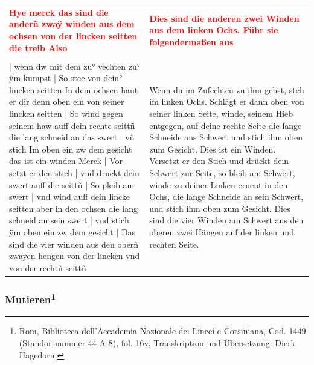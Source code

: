 \begin{longtable}{p{6.25cm}p{6.25cm}}
\textbf{\textcolor{red}{Hye merck das sind die anderñ zwaÿ winden aus dem ochsen von der lincken seitten die treib Also}}
&
\textbf{\textcolor{red}{Dies sind die anderen zwei Winden aus dem linken Ochs. Führ sie folgendermaßen aus}}
\\
\\
| wenn dw mit dem zu° vechten zu° ÿm kumpst | So stee von dein° lincken seitten In dem ochsen haut er dir denn oben ein von seiner lincken seitten | So wind gegen seinem haw auff dein rechte seittñ die lang schneid an das swert | vñ stich Im oben ein zw dem gesicht das ist ein winden Merck | Vor setzt er den stich | vnd druckt dein swert auff die seittñ | So pleib am swert | vnd wind auff dein lincke seitten aber in den ochsen die lang schneid an sein swert | vnd stich ÿm oben ein zw dem gesicht | Das sind die vier winden aus den oberñ zwaÿen hengen von der lincken vnd von der rechtñ seittñ
&
Wenn du im Zufechten zu ihm gehst, steh im linken Ochs. Schlägt er dann oben von seiner  linken Seite, winde, seinem Hieb entgegen, auf deine rechte Seite die lange Schneide ans Schwert und stich ihm oben zum Gesicht. Dies ist ein Winden. Versetzt er den Stich und drückt dein Schwert zur Seite, so bleib am Schwert, winde zu deiner Linken erneut in den Ochs, die lange Schneide an sein Schwert, und stich ihm oben zum Gesicht. Dies sind die vier Winden am Schwert aus den oberen zwei Hängen auf der linken und rechten Seite.
\end{longtable}

\newpage

\begin{center}
\end{center}

\newpage

\subsubsection[Mutieren]{Mutieren\footnote{\hspace*{0.5ex}Rom, Biblioteca dell'Accademia Nazionale dei Lincei e Corsiniana, Cod. 1449 (Standortnummer 44 A 8), fol. 16v, Transkription und Übersetzung: Dierk Hagedorn.}}

